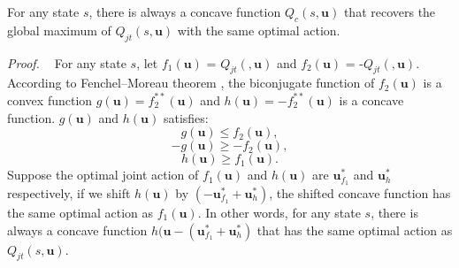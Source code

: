 \iffalse
 \begin{equation}
E(|S_{mono}|) \leq \frac{e+1}{|\overline{u}|}\cdot \delta^{n-1} \cdot |S|^n
\end{equation}
where $\delta = min_i(P(X_i|X_{i-1}...X_1)$ and $0 < \delta < 1$.


\noindent\textit{\textbf{Step3}: Calculate the upper bound of the fraction}
The final fraction of $E(|S_{mono}|)$ over the overall state space satisfies:
 \begin{equation}
\frac{E(|S_{mono}|)}{|S|^n} \leq \frac{e+1}{|\overline{u}|}\cdot \delta^{n-1}
\end{equation}
when $n \geq log_{|S|}(2|\overline{u}|\cdot log_2|\overline{u}|) + 1$.
\fi 


{\begin{prop}
For any state $s$, there is always a concave function $Q_{c}(s, \textbf{u})$ that recovers the global maximum of  $Q_{jt}(s, \textbf{u})$ with the same optimal action.
\end{prop}

\noindent\textit{Proof. \ } For any state $s$, let $f_1(\textbf{u})$ = $Q_{jt}(, \textbf{u})$ and $f_2(\textbf{u})$ = -$Q_{jt}(, \textbf{u})$. According to Fenchel–Moreau theorem \cite{convex_conjugate}, the biconjugate function of $f_2(\textbf{u})$ is a convex function $g(\textbf{u}) = f_2^{**}(\textbf{u})$ and $h(\textbf{u}) = -f_2^{**}(\textbf{u})$  is a concave function. $g(\textbf{u})$ and $h(\textbf{u})$ satisfies:
 \begin{equation}
    g(\textbf{u}) \leq f_2(\textbf{u}), 
\end{equation}
 \begin{equation}
    -g(\textbf{u}) \geq -f_2(\textbf{u}), 
\end{equation}
 \begin{equation}
    h(\textbf{u}) \geq f_1(\textbf{u}).
\end{equation}
Suppose the optimal joint action of $f_1(\textbf{u})$ and $h(\textbf{u})$ are $\textbf{u}_{f_1}^*$ and $\textbf{u}_h^*$ respectively,  if we shift $h(\textbf{u})$ by $(-\textbf{u}_{f_1}^* + \textbf{u}_h^*)$, the shifted concave function has the same optimal action as $f_1(\textbf{u})$. In other words, for any state $s$, there is always a concave function $h(\textbf{u}-(\textbf{u}_{f_1}^* + \textbf{u}_h^*)$ that has the same optimal action as $Q_{jt}(s, \textbf{u})$. 
}



